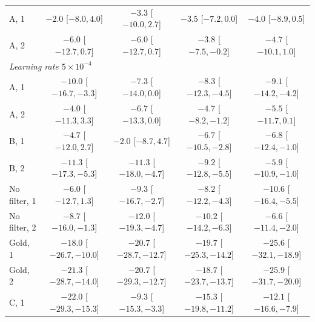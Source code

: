 \documentclass[runningheads]{llncs}
\begin{document}
\begin{table}[!htb]
\begin{tabular}{lcccc}
A, 1 & $-2.0$ [$-8.0,4.0$] & $-3.3$ [$-10.0,2.7$] & $-3.5$ [$-7.2,0.0$] & $-4.0$ [$-8.9,0.5$] \\
A, 2 & $-6.0$ [$-12.7,0.7$] & $-6.0$ [$-12.7,0.7$] & $-3.8$ [$-7.5,-0.2$] & $-4.7$ [$-10.1,1.0$] \\
\midrule
\multicolumn{5}{l}{\emph{Learning rate $5\!\times\!10^{-4}$}} \\
A, 1 & $-10.0$ [$-16.7,-3.3$] & $-7.3$ [$-14.0,0.0$] & $-8.3$ [$-12.3,-4.5$] & $-9.1$ [$-14.2,-4.2$] \\
A, 2 & $-4.0$ [$-11.3,3.3$] & $-6.7$ [$-13.3,0.0$] & $-4.7$ [$-8.2,-1.2$] & $-5.5$ [$-11.7,0.1$] \\
B, 1 & $-4.7$ [$-12.0,2.7$] & $-2.0$ [$-8.7,4.7$] & $-6.7$ [$-10.5,-2.8$] & $-6.8$ [$-12.4,-1.0$] \\
B, 2 & $-11.3$ [$-17.3,-5.3$] & $-11.3$ [$-18.0,-4.7$] & $-9.2$ [$-12.8,-5.5$] & $-5.9$ [$-10.9,-1.0$] \\
No filter, 1 & $-6.0$ [$-12.7,1.3$] & $-9.3$ [$-16.7,-2.7$] & $-8.2$ [$-12.2,-4.3$] & $-10.6$ [$-16.4,-5.5$] \\
No filter, 2 & $-8.7$ [$-16.0,-1.3$] & $-12.0$ [$-19.3,-4.7$] & $-10.2$ [$-14.2,-6.3$] & $-6.6$ [$-11.4,-2.0$] \\
Gold, 1 & $-18.0$ [$-26.7,-10.0$] & $-20.7$ [$-28.7,-12.7$] & $-19.7$ [$-25.3,-14.2$] & $-25.6$ [$-32.1,-18.9$] \\
Gold, 2 & $-21.3$ [$-28.7,-14.0$] & $-20.7$ [$-29.3,-12.7$] & $-18.7$ [$-23.7,-13.7$] & $-25.9$ [$-31.7,-20.0$] \\
C, 1 & $-22.0$ [$-29.3,-15.3$] & $-9.3$ [$-15.3,-3.3$] & $-15.3$ [$-19.8,-11.2$] & $-12.1$ [$-16.6,-7.9$] \\
\bottomrule
\end{tabular}
\end{table}
\end{document}
